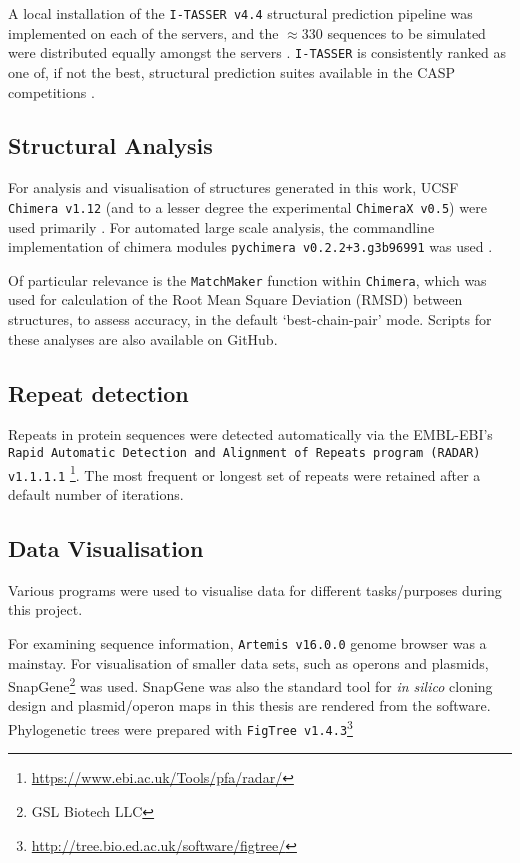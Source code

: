 A local installation of the \texttt{I-TASSER v4.4} structural prediction pipeline was implemented on each of the servers, and the $\approx$330 sequences to be simulated were distributed equally amongst the servers \citep{Yang2014, Roy2010, Zhang2008}. \texttt{I-TASSER} is consistently ranked as one of, if not the best, structural prediction suites available in the CASP competitions \citep{Moult2015}. 


\subsection{Structural Analysis}
For analysis and visualisation of structures generated in this work, UCSF \texttt{Chimera v1.12} (and to a lesser degree the experimental \texttt{ChimeraX v0.5}) were used primarily \citep{Pettersen2004, Goddard2018}. For automated large scale analysis, the commandline implementation of chimera modules \texttt{pychimera v0.2.2+3.g3b96991} was used \citep{Rodriguez-GuerraPedregal2018}.

Of particular relevance is the \texttt{MatchMaker} function within \texttt{Chimera}, which was used for calculation of the Root Mean Square Deviation (RMSD) between structures, to assess accuracy, in the default `best-chain-pair' mode. Scripts for these analyses are also available on GitHub.

\subsection{Repeat detection}
Repeats in protein sequences were detected automatically via the EMBL-EBI's \texttt{Rapid Automatic Detection and Alignment of Repeats program (RADAR) v1.1.1.1} \footnote{\url{https://www.ebi.ac.uk/Tools/pfa/radar/}}. The most frequent or longest set of repeats were retained after a default number of iterations.

\subsection{Data Visualisation}
Various programs were used to visualise data for different tasks/purposes during this project.

For examining sequence information, \texttt{Artemis v16.0.0} \citep{Rutherford2000} genome browser was a mainstay. For visualisation of smaller data sets, such as operons and plasmids, SnapGene\footnote{GSL Biotech LLC} was used. SnapGene was also the standard tool for \emph{in silico} cloning design and plasmid/operon maps in this thesis are rendered from the software. Phylogenetic trees were prepared with \texttt{FigTree v1.4.3}\footnote{\url{http://tree.bio.ed.ac.uk/software/figtree/}}

